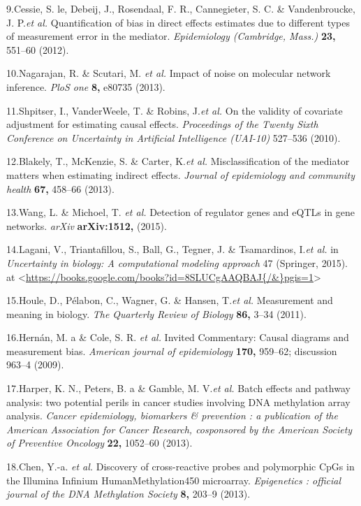 \documentclass[]{article}
\begin{document}
9.Cessie, S. le, Debeij, J., Rosendaal, F. R., Cannegieter, S. C. \&
Vandenbroucke, J. P.\emph{et al.} Quantification of bias in direct
effects estimates due to different types of measurement error in the
mediator. \emph{Epidemiology (Cambridge, Mass.)} \textbf{23,} 551--60
(2012).

10.Nagarajan, R. \& Scutari, M. \emph{et al.} Impact of noise on
molecular network inference. \emph{PloS one} \textbf{8,} e80735 (2013).

11.Shpitser, I., VanderWeele, T. \& Robins, J.\emph{et al.} On the
validity of covariate adjustment for estimating causal effects.
\emph{Proceedings of the Twenty Sixth Conference on Uncertainty in
Artificial Intelligence (UAI-10)} 527--536 (2010).

12.Blakely, T., McKenzie, S. \& Carter, K.\emph{et al.}
Misclassification of the mediator matters when estimating indirect
effects. \emph{Journal of epidemiology and community health}
\textbf{67,} 458--66 (2013).

13.Wang, L. \& Michoel, T. \emph{et al.} Detection of regulator genes
and eQTLs in gene networks. \emph{arXiv} \textbf{arXiv:1512,} (2015).

14.Lagani, V., Triantafillou, S., Ball, G., Tegner, J. \& Tsamardinos,
I.\emph{et al.} in \emph{Uncertainty in biology: A computational
modeling approach} 47 (Springer, 2015). at
\textless{}\url{https://books.google.com/books?id=8SLUCgAAQBAJ\{/\&\}pgis=1}\textgreater{}

15.Houle, D., P{é}labon, C., Wagner, G. \& Hansen, T.\emph{et al.}
Measurement and meaning in biology. \emph{The Quarterly Review of
Biology} \textbf{86,} 3--34 (2011).

16.Hern{á}n, M. a \& Cole, S. R. \emph{et al.} Invited Commentary:
Causal diagrams and measurement bias. \emph{American journal of
epidemiology} \textbf{170,} 959--62; discussion 963--4 (2009).

17.Harper, K. N., Peters, B. a \& Gamble, M. V.\emph{et al.} Batch
effects and pathway analysis: two potential perils in cancer studies
involving DNA methylation array analysis. \emph{Cancer epidemiology,
biomarkers \& prevention : a publication of the American Association for
Cancer Research, cosponsored by the American Society of Preventive
Oncology} \textbf{22,} 1052--60 (2013).

18.Chen, Y.-a. \emph{et al.} Discovery of cross-reactive probes and
polymorphic CpGs in the Illumina Infinium HumanMethylation450
microarray. \emph{Epigenetics : official journal of the DNA Methylation
Society} \textbf{8,} 203--9 (2013).
\end{document}
